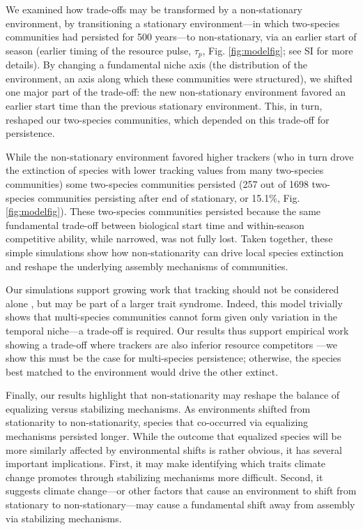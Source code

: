 \documentclass[11pt,letterpaper]{article}
\begin{document}
We examined how trade-offs may be transformed by a non-stationary environment, by transitioning a stationary environment---in which two-species communities had persisted for 500 years---to non-stationary, via an earlier start of season (earlier timing of the resource pulse, $\tau_p$, Fig. \ref{fig:modelfig}; see SI for more details). By changing a fundamental niche axis (the distribution of the environment, an axis along which these communities were structured), we shifted one major part of the trade-off: the new non-stationary environment favored an earlier start time than the previous stationary environment. This, in turn, reshaped our two-species communities, which depended on this trade-off for persistence. 

While the non-stationary environment favored higher trackers (who in turn drove the extinction of species with lower tracking values from many two-species communities) some two-species communities persisted (257 out of 1698 two-species communities persisting after end of stationary, or 15.1\%, Fig. \ref{fig:modelfig}). These two-species communities persisted because the same fundamental trade-off between biological start time and within-season competitive ability, while narrowed, was not fully lost. Taken together, these simple simulations show how non-stationarity can drive local species extinction and reshape the underlying assembly mechanisms of communities.

Our simulations support growing work that tracking should not be considered alone \citep{Diamond:2011nx,Dorji2013,Ishioka2013,kharouba2014,du2017}, but may be part of a larger trait syndrome. Indeed, this model trivially shows that multi-species communities cannot form given only variation in the temporal niche---a trade-off is required. Our results thus support empirical work showing a trade-off where trackers are also inferior resource competitors \citep{lasky2016,Zhu2016BioLetters}---we show this must be the case for multi-species persistence; otherwise, the species best matched to the environment would drive the other extinct.

Finally, our results highlight that non-stationarity may reshape the balance of equalizing versus stabilizing mechanisms. As environments shifted from stationarity to non-stationarity, species that co-occurred via equalizing mechanisms persisted longer. While the outcome that equalized species will be more similarly affected by environmental shifts is rather obvious, it has several important implications. First, it may make identifying which traits climate change promotes through stabilizing mechanisms more difficult. Second, it suggests climate change---or other factors that cause an environment to shift from stationary to non-stationary---may cause a fundamental shift away from assembly via stabilizing mechanisms. %
\end{document}
